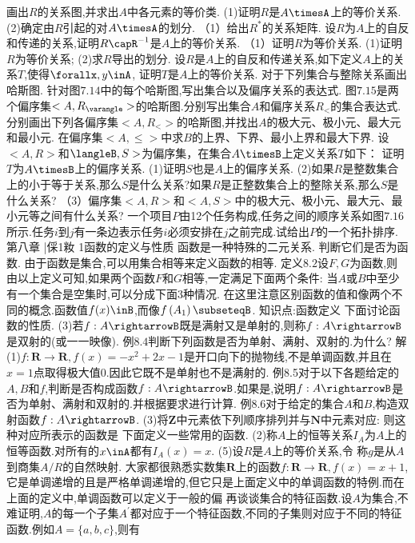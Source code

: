 画出$R$的关系图,并求出$A$中各元素的等价类.
(1)证明$R$是$A\timesA$上的等价关系.
(2)确定由$R$引起的对$A\timesA$的划分.
（1）给出$R^{*}$的关系矩阵.
设$R$为$A$上的自反和传递的关系,证明$R\capR^{-1}$是$A$上的等价关系.
（1）证明$R$为等价关系.
(1)证明$R$为等价关系;
(2)求$R$导出的划分.
设$R$是$A$上的自反和传递关系,如下定义$A$上的关系$T$,使得$\forallx,y\inA$,
证明$T$是$A$上的等价关系.
对于下列集合与整除关系画出哈斯图.
针对图$7.14$中的每个哈斯图,写出集合以及偏序关系的表达式.
图$7.15$是两个偏序集$<A,R_{\varangle}>$的哈斯图.分别写出集合$A$和偏序关系$R_{<}$的集合表达式.
分别画出下列各偏序集$<A,R_{<}>$的哈斯图,并找出$A$的极大元、极小元、最大元和最小元.
在偏序集$<A,\leqslant>$中求$B$的上界、下界、最小上界和最大下界.
设$<A,R>$和$\langleB,S>$为偏序集，在集合$A\timesB$上定义关系$T$如下：
证明$T$为$A\timesB$上的偏序关系.
(1)证明$S$也是$A$上的偏序关系.
(2)如果$R$是整数集合上的小于等于关系,那么$S$是什么关系?如果$R$是正整数集合上的整除关系,那么$S$是什么关系?
（3）偏序集$<A,R>$和$<A,S>$中的极大元、极小元、最大元、最小元等之间有什么关系?
一个项目$P$由12个任务构成,任务之间的顺序关系如图$7.16$所示.任务$i$到$j$有一条边表示任务$i$必须安排在$j$之前完成.试给出$P$的一个拓扑排序.
{第八章
|倸1籹}
{1函数的定义与性质}
函数是一种特殊的二元关系.
判断它们是否为函数.
由于函数是集合,可以用集合相等来定义函数的相等.
定义$8.2$设$F,G$为函数,则
由以上定义可知,如果两个函数$F$和$G$相等,一定满足下面两个条件:
当$A$或$B$中至少有一个集合是空集时,可以分成下面3种情况.
在这里注意区别函数的值和像两个不同的概念.函数值$f(x)\inB$,而像$f\left(A_{1}\right)\subseteqB$.
知识点:函数定义
下面讨论函数的性质.
(3)若$f:A\rightarrowB$既是满射又是单射的,则称$f:A\rightarrowB$是双射的(或一一映像).
例$8.4$判断下列函数是否为单射、满射、双射的.为什么?
解(1)$f:\mathbf{R}\rightarrow\mathbf{R},f(x)=-x^{2}+2x-1$是开口向下的抛物线,不是单调函数,并且在$x=1$点取得极大值0.因此它既不是单射也不是满射的.
例8.5对于以下各题给定的$A,B$和$f$,判断是否构成函数$f:A\rightarrowB$.如果是,说明$f:A\rightarrowB$是否为单射、满射和双射的.并根据要求进行计算.
例$8.6$对于给定的集合$A$和$B$,构造双射函数$f:A\rightarrowB$.
(3)将$\mathbf{Z}$中元素依下列顺序排列并与$\mathbf{N}$中元素对应:
则这种对应所表示的函数是
下面定义一些常用的函数.
(2)称$A$上的恒等关系$I_{A}$为$A$上的恒等函数.对所有的$x\inA$都有$I_{A}(x)=x$.
(5)设$R$是$A$上的等价关系,令
称$g$是从$A$到商集$A/R$的自然映射.
大家都很熟悉实数集$\mathbf{R}$上的函数$f:\mathbf{R}\rightarrow\mathbf{R},f(x)=x+1$,它是单调递增的且是严格单调递增的,但它只是上面定义中的单调函数的特例.而在上面的定义中,单调函数可以定义于一般的偏
再谈谈集合的特征函数.设$A$为集合,不难证明,$A$的每一个子集$A^{\prime}$都对应于一个特征函数,不同的子集则对应于不同的特征函数.例如$A=\{a,b,c\}$,则有
